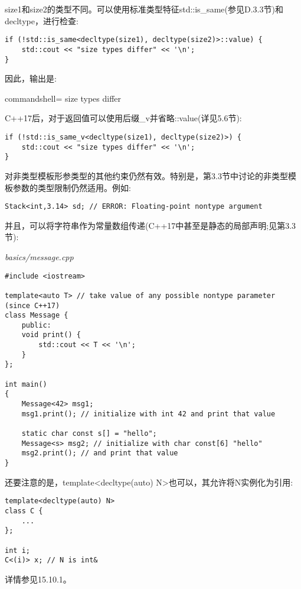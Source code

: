 size1和size2的类型不同。可以使用标准类型特征std::is\_same(参见D.3.3节)和decltype，进行检查:

\begin{lstlisting}[style=styleCXX]
if (!std::is_same<decltype(size1), decltype(size2)>::value) {
	std::cout << "size types differ" << '\n';
}
\end{lstlisting}

因此，输出是:

\begin{tcblisting}{commandshell={}}
size types differ
\end{tcblisting}

C++17后，对于返回值可以使用后缀\_v并省略::value(详见5.6节):

\begin{lstlisting}[style=styleCXX]
if (!std::is_same_v<decltype(size1), decltype(size2)>) {
	std::cout << "size types differ" << '\n';
}
\end{lstlisting}

对非类型模板形参类型的其他约束仍然有效。特别是，第3.3节中讨论的非类型模板参数的类型限制仍然适用。例如:

\begin{lstlisting}[style=styleCXX]
Stack<int,3.14> sd; // ERROR: Floating-point nontype argument
\end{lstlisting}

并且，可以将字符串作为常量数组传递(C++17中甚至是静态的局部声明;见第3.3节):

\noindent
\textit{basics/message.cpp}
\begin{lstlisting}[style=styleCXX]
#include <iostream>

template<auto T> // take value of any possible nontype parameter (since C++17)
class Message {
	public:
	void print() {
		std::cout << T << '\n';
	}
};

int main()
{
	Message<42> msg1;
	msg1.print(); // initialize with int 42 and print that value
	
	static char const s[] = "hello";
	Message<s> msg2; // initialize with char const[6] "hello"
	msg2.print(); // and print that value
}
\end{lstlisting}

还要注意的是，template<decltype(auto) N>也可以，其允许将N实例化为引用:

\begin{lstlisting}[style=styleCXX]
template<decltype(auto) N>
class C {
	...
};

int i;
C<(i)> x; // N is int&
\end{lstlisting}

详情参见15.10.1。




